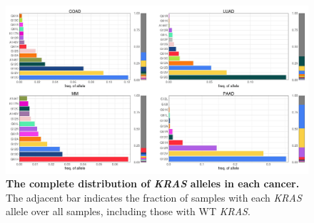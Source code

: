 \documentclass[english, 10pt, letterpaper]{article}
\newcommand{\beginsupplement}{%
        \setcounter{table}{0}
        \renewcommand{\thetable}{\arabic{table}}%
        \setcounter{figure}{0}
        \renewcommand{\thefigure}{\arabic{figure}}%
    }
\newcommand{\KRAS}{\emph{KRAS}}
\begin{document}
\beginsupplement

\makeatletter
\renewcommand{\fnum@figure}{Supplemental \figurename~\thefigure}
\makeatother



\begin{figure}[p]
\centering
\includegraphics[width=\textwidth]{figures/Supp_Fig_1.jpeg}
\caption{
    \textbf{The complete distribution of \KRAS{} alleles in each cancer.} The adjacent bar indicates the fraction of samples with each \KRAS{} allele over all samples, including those with WT \KRAS{}.
}
\label{sfig:expanded-kras-allele-distribution}
\end{figure}
\end{document}
